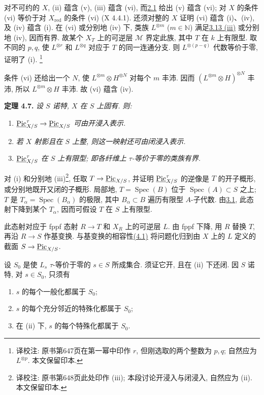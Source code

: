对不可约的 \(X\), (ii) 蕴含 (v), (iii) 蕴含 (vi), 而\hyperlink{sga6.e13.para.2-1}{2.1} 给出 (v) 蕴含 (vi); 对 \(X\) 的条件 (vi) 等价于对 \(X_{\mathrm{red}}\) 的条件 (vi) (X 4.4.1). 还须对整的 \(X\) 证明 (vi) 蕴含 (i)、(iv), 及 (iv) 蕴含 (i). 在 (vi) 或分别地 (iv) 下, 类族 \(L^{\otimes m}\) (\(m\in\mathbb N\)) 满足\hyperlink{sga6.e13.thm.3-13}{3.13 (iii)} 或分别地 (iv), 因而有界. 故某个 \(X_T\) 上的可逆层 \(\mathcal M\) 界定此族, 其中 \(T\) 在 \(k\) 上有限型. 取不同的 \(p,q\), 使 \(L^{\otimes r}\) 和 \(L^{\otimes q}\) 对应于 \(T\) 的同一连通分支. 则 \(L^{\otimes(p-q)}\) 代数等价于零, 证明了 (i).
\footnote{译校注: 原书第647页在第一幂中印作 $r$, 但刚选取的两个整数为 $p,q$; 自然应为 $L^{\otimes p}$. 本文保留印本.}

条件 (vi) 还给出一个 \(N\), 使 \(L^{\otimes m}\otimes H^{\otimes N}\) 对每个 \(m\) 丰沛. 因而 \((L^{\otimes m}\otimes H)^{\otimes N}\) 丰沛, 所以 \(L^{\otimes m}\otimes H\) 丰沛. 故 (vi) 蕴含 (iv).

\textbf{定理 4.7.} \emph{设 \(S\) 诺特, \(X\) 在 \(S\) 上固有. 则:}
\begin{enumerate}[label=(\roman*)]
\item \emph{\(\underline{\operatorname{Pic}}^{\tau}_{X/S}\to\underline{\operatorname{Pic}}_{X/S}\) 可由开浸入表示.}
\item \emph{若 \(X\) 射影且在 \(S\) 上整, 则这一映射还可由闭浸入表示.}
\item \emph{\(\underline{\operatorname{Pic}}^{\tau}_{X/S}\) 在 \(S\) 上有限型; 即各纤维上 \(\tau\)-等价于零的类族有界.}
\end{enumerate}

对 (i) 和分别地 (iii)\footnote{译校注: 原书第648页此处印作 (iii); 本段讨论开浸入与闭浸入, 自然应为 (ii). 本文保留印本.}, 任取 \(T\to\underline{\operatorname{Pic}}_{X/S}\), 并证明 \(\underline{\operatorname{Pic}}^{\tau}_{X/S}\) 的逆像是 \(T\) 的开子概形, 或分别地既开又闭的子概形. 局部地, \(T=\operatorname{Spec}(B)\) 位于 \(\operatorname{Spec}(A)\subset S\) 之上; \(T\) 是 \(T_\alpha=\operatorname{Spec}(B_\alpha)\) 的极限, 其中 \(B_\alpha\subset B\) 遍历有限型 \(A\)-子代数. 由\hyperlink{sga6.e13.lem.3-1}{3.1}, 此态射下降到某个 \(T_\alpha\), 因而可假设 \(T\) 在 \(S\) 上有限型.

此态射对应于 fppf 态射 \(R\to T\) 和 \(X_R\) 上的可逆层 \(L\). 由 fppf 下降, 用 \(R\) 替换 \(T\), 再沿 \(R\to S\) 作基变换. 与基变换的相容性\hyperlink{sga6.e13.para.4-1}{(4.1)} 将问题化归到由 \(X\) 上的 \(L\) 定义的截面 \(S\to\underline{\operatorname{Pic}}_{X/S}\).

设 \(S_0\) 是使 \(L_s\) \(\tau\)-等价于零的 \(s\in S\) 所成集合. 须证它开, 且在 (ii) 下还闭. 因 \(S\) 诺特, 对 \(s\in S_0\), 只须有
\begin{enumerate}[label=(\alph*)]
\item \(s\) 的每个一般化都属于 \(S_0\);
\item \(s\) 的每个充分邻近的特殊化都属于 \(S_0\);
\item 在 (ii) 下, \(s\) 的每个特殊化都属于 \(S_0\).
\end{enumerate}

